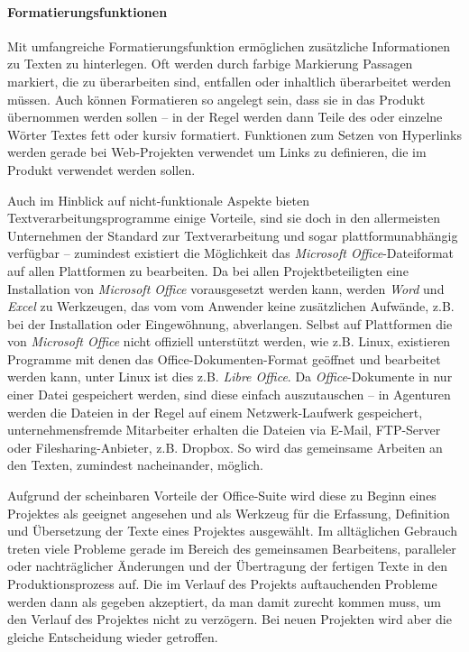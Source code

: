 \paragraph{Formatierungsfunktionen} Mit umfangreiche Formatierungsfunktion ermöglichen zusätzliche Informationen zu Texten zu hinterlegen. Oft werden durch farbige Markierung Passagen markiert, die zu überarbeiten sind, entfallen oder inhaltlich überarbeitet werden müssen. Auch können Formatieren so angelegt sein, dass sie in das Produkt übernommen werden sollen -- in der Regel werden dann Teile des oder einzelne Wörter Textes fett oder kursiv formatiert. Funktionen zum Setzen von Hyperlinks werden gerade bei Web-Projekten verwendet um Links zu definieren, die im Produkt verwendet werden sollen.

\bigskip

Auch im Hinblick auf nicht-funktionale Aspekte bieten Textverarbeitungsprogramme einige Vorteile, sind sie doch in den allermeisten Unternehmen der Standard zur Textverarbeitung und sogar plattformunabhängig verfügbar -- zumindest existiert die Möglichkeit das \emph{Microsoft Office}-Dateiformat auf allen Plattformen zu bearbeiten. Da bei allen Projektbeteiligten eine Installation von \emph{Microsoft Office} vorausgesetzt werden kann, werden \emph{Word} und \emph{Excel} zu  Werkzeugen, das vom vom Anwender keine zusätzlichen Aufwände, z.B. bei der Installation oder Eingewöhnung, abverlangen. Selbst auf Plattformen die von \emph{Microsoft Office} nicht offiziell unterstützt werden, wie z.B. Linux, existieren Programme mit denen das Office-Dokumenten-Format geöffnet und bearbeitet werden kann, unter Linux ist dies z.B. \emph{Libre Office}. Da \emph{Office}-Dokumente in nur einer Datei gespeichert werden, sind diese einfach auszutauschen -- in Agenturen werden die Dateien in der Regel auf einem Netzwerk-Laufwerk gespeichert, unternehmensfremde Mitarbeiter erhalten die Dateien via E-Mail, FTP-Server oder Filesharing-Anbieter, z.B. Dropbox. So wird das gemeinsame Arbeiten an den Texten, zumindest nacheinander, möglich.

\bigskip

Aufgrund der scheinbaren Vorteile der Office-Suite wird diese zu Beginn eines Projektes als geeignet angesehen und als Werkzeug für die Erfassung, Definition und Übersetzung der Texte eines Projektes ausgewählt. Im alltäglichen Gebrauch treten viele Probleme gerade im Bereich des gemeinsamen Bearbeitens, paralleler oder nachträglicher Änderungen und der Übertragung der fertigen Texte in den Produktionsprozess auf. Die im Verlauf des Projekts auftauchenden Probleme werden dann als gegeben akzeptiert, da man  damit zurecht kommen muss, um den Verlauf des Projektes nicht zu verzögern. Bei neuen Projekten wird aber die gleiche Entscheidung wieder getroffen.

